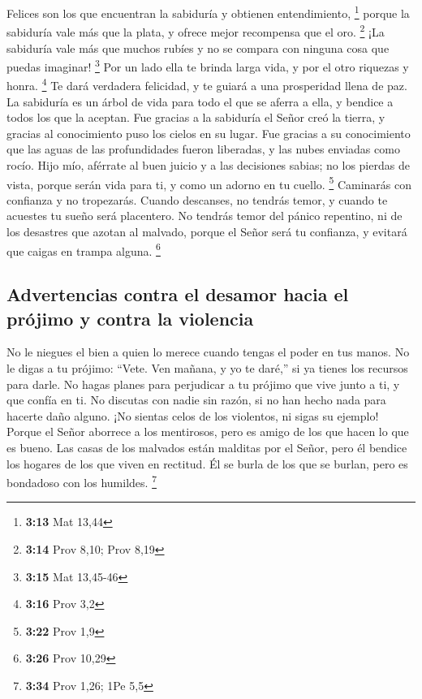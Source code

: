  Felices son los que encuentran la sabiduría y obtienen
entendimiento, \footnote{\textbf{3:13} Mat 13,44}  porque
la sabiduría vale más que la plata, y ofrece mejor recompensa que el
oro. \footnote{\textbf{3:14} Prov 8,10; Prov 8,19}  ¡La
sabiduría vale más que muchos rubíes y no se compara con ninguna cosa
que puedas imaginar! \footnote{\textbf{3:15} Mat 13,45-46} 
Por un lado ella te brinda larga vida, y por el otro riquezas y honra.
\footnote{\textbf{3:16} Prov 3,2}  Te dará verdadera
felicidad, y te guiará a una prosperidad llena de paz.  La
sabiduría es un árbol de vida para todo el que se aferra a ella, y
bendice a todos los que la aceptan.  Fue gracias a la
sabiduría el Señor creó la tierra, y gracias al conocimiento puso los
cielos en su lugar.  Fue gracias a su conocimiento que las
aguas de las profundidades fueron liberadas, y las nubes enviadas como
rocío.  Hijo mío, aférrate al buen juicio y a las
decisiones sabias; no los pierdas de vista,  porque serán
vida para ti, y como un adorno en tu cuello. \footnote{\textbf{3:22}
  Prov 1,9}  Caminarás con confianza y no tropezarás.
 Cuando descanses, no tendrás temor, y cuando te acuestes
tu sueño será placentero.  No tendrás temor del pánico
repentino, ni de los desastres que azotan al malvado, 
porque el Señor será tu confianza, y evitará que caigas en trampa
alguna. \footnote{\textbf{3:26} Prov 10,29}

\hypertarget{advertencias-contra-el-desamor-hacia-el-pruxf3jimo-y-contra-la-violencia}{%
\subsection{Advertencias contra el desamor hacia el prójimo y contra la
violencia}\label{advertencias-contra-el-desamor-hacia-el-pruxf3jimo-y-contra-la-violencia}}

 No le niegues el bien a quien lo merece cuando tengas el
poder en tus manos.  No le digas a tu prójimo: ``Vete. Ven
mañana, y yo te daré,'' si ya tienes los recursos para darle.
 No hagas planes para perjudicar a tu prójimo que vive
junto a ti, y que confía en ti.  No discutas con nadie sin
razón, si no han hecho nada para hacerte daño alguno.  ¡No
sientas celos de los violentos, ni sigas su ejemplo! 
Porque el Señor aborrece a los mentirosos, pero es amigo de los que
hacen lo que es bueno.  Las casas de los malvados están
malditas por el Señor, pero él bendice los hogares de los que viven en
rectitud.  Él se burla de los que se burlan, pero es
bondadoso con los humildes. \footnote{\textbf{3:34} Prov 1,26; 1Pe 5,5}

